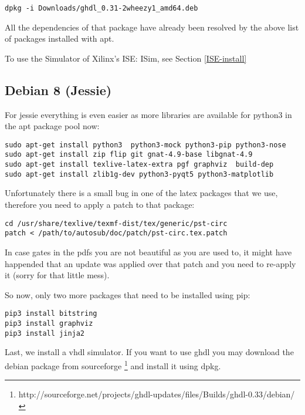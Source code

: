 \begin{verbatim}
dpkg -i Downloads/ghdl_0.31-2wheezy1_amd64.deb
\end{verbatim}

All the dependencies of that package have already been resolved by the above
list of packages installed with apt.

To use the Simulator of Xilinx's ISE: ISim, see Section \ref{ISE-install}


\subsection{Debian 8 (Jessie)}

For jessie everything is even easier as more libraries are available for python3 in the
apt package pool now:

\begin{verbatim}
sudo apt-get install python3  python3-mock python3-pip python3-nose
sudo apt-get install zip flip git gnat-4.9-base libgnat-4.9
sudo apt-get install texlive-latex-extra pgf graphviz  build-dep
sudo apt-get install zlib1g-dev python3-pyqt5 python3-matplotlib
\end{verbatim}

Unfortunately there is a small bug in one of the latex packages that we use,
therefore you need to apply a patch to that package:

\begin{verbatim}
cd /usr/share/texlive/texmf-dist/tex/generic/pst-circ
patch < /path/to/autosub/doc/patch/pst-circ.tex.patch
\end{verbatim}

In case gates in the pdfs you are not beautiful as you are used to, it might have
happended that an update was applied over that patch and you need to re-apply it (sorry for that little mess).

So now, only two more packages that need to be installed using pip:

\begin{verbatim}
pip3 install bitstring
pip3 install graphviz
pip3 install jinja2
\end{verbatim}

Last, we install a vhdl simulator. If you want to use ghdl you may download
the debian package from sourceforge \footnote{http://sourceforge.net/projects/ghdl-updates/files/Builds/ghdl-0.33/debian/}
and install it using dpkg.

